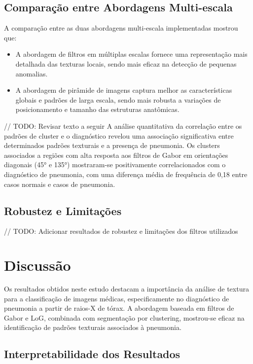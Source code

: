 \documentclass[sigconf,nonacm]{acmart}
\begin{document}
\subsection{Comparação entre Abordagens Multi-escala}

A comparação entre as duas abordagens multi-escala implementadas mostrou que:

\begin{itemize}
  \item A abordagem de filtros em múltiplas escalas fornece uma representação mais detalhada das texturas locais, sendo mais eficaz na detecção de pequenas anomalias.
  \item A abordagem de pirâmide de imagens captura melhor as características globais e padrões de larga escala, sendo mais robusta a variações de posicionamento e tamanho das estruturas anatômicas.
\end{itemize}

// TODO: Revisar texto a seguir
A análise quantitativa da correlação entre os padrões de cluster e o diagnóstico revelou uma associação significativa entre determinados padrões texturais e a presença de pneumonia. Os clusters associados a regiões com alta resposta aos filtros de Gabor em orientações diagonais (45° e 135°) mostraram-se positivamente correlacionados com o diagnóstico de pneumonia, com uma diferença média de frequência de 0,18 entre casos normais e casos de pneumonia.

\subsection{Robustez e Limitações}

// TODO: Adicionar resultados de robustez e limitações dos filtros utilizados

\section{Discussão}

Os resultados obtidos neste estudo destacam a importância da análise de textura para a classificação de imagens médicas, especificamente no diagnóstico de pneumonia a partir de raios-X de tórax. A abordagem baseada em filtros de Gabor e LoG, combinada com segmentação por clustering, mostrou-se eficaz na identificação de padrões texturais associados à pneumonia.

\subsection{Interpretabilidade dos Resultados}
\end{document}
